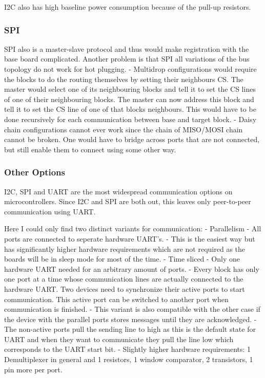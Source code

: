 I2C also has high baseline power consumption because of the pull-up resistors. 

\subsubsection{SPI}

SPI also is a master-slave protocol and thus would make registration with the base board complicated.
Another problem is that SPI all variations of the bus topology do not work for hot plugging.
- Multidrop configurations would require the blocks to do the routing themselves by setting their neighbours CS.
  The master would select one of its neighbouring blocks and tell it to set the CS lines of one of their neighbouring blocks.
  The master can now address this block and tell it to set the CS line of one of that blocks neighbours.
  This would have to be done recursively for each communication between base and target block.
- Daisy chain configurations cannot ever work since the chain of MISO/MOSI chain cannot be broken.
  One would have to bridge across ports that are not connected, but still enable them to connect using some other way.

\subsubsection{Other Options}

I2C, SPI and UART are the most widespread communication options on microcontrollers.
Since I2C and SPI are both out, this leaves only peer-to-peer communication using UART.

Here I could only find two distinct variants for communication:
- Parallelism
  - All ports are connected to seperate hardware UART's.
  - This is the easiest way but has significantly higher hardware requirements which are not required as the boards will be in sleep mode for most of the time.
- Time sliced 
  - Only one hardware UART needed for an arbitrary amount of ports.
  - Every block has only one port at a time whose communication lines are actually connected to the hardware UART. 
    Two devices need to synchronize their active ports to start communication. 
    This active port can be switched to another port when communication is finished.
  - This variant is also compatible with the other case if the device with the parallel ports stores messages until they are acknowledged.
    - The non-active ports pull the sending line to high as this is the default state for UART and when they want to communicate they pull the line low which corresponds to the UART start bit.
  - Slightly higher hardware requirements: 1 Demultiplexer in general and 1 resistors, 1 window comparator, 2 transistors, 1 pin more per port.

